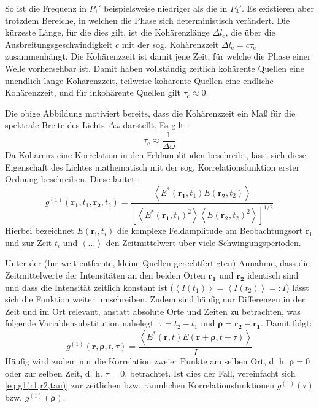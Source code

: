 So ist die Frequenz in $P_1'$ beispielsweise niedriger als die in $P_3'$. 
Es existieren aber trotzdem Bereiche, in welchen die Phase sich deterministisch verändert. 
Die kürzeste Länge, für die dies gilt, ist die Kohärenzlänge $\Delta l_\mathrm{c}$, die über die Ausbreitungsgeschwindigkeit $c$ mit der sog. Kohärenzzeit $\Delta l_\mathrm{c} = c\tau_{\mathrm{c}}$ zusammenhängt. 
Die Kohärenzzeit ist damit jene Zeit, für welche die Phase einer Welle vorhersehbar ist. 
Damit haben vollständig zeitlich kohärente Quellen eine unendlich lange Kohärenzzeit, teilweise kohärente Quellen eine endliche Kohärenzzeit, und für inkohärente Quellen gilt $\tau_{\mathrm{c}}\approx 0$. 

Die obige Abbildung motiviert bereits, dass die Kohärenzzeit ein Maß für die spektrale Breite des Lichts $\Delta \omega$ darstellt. 
Es gilt \cite{foxQuantumOpticsIntroduction2006}:
\begin{equation}
    \tau_{\mathrm{c}}  \approx \frac{1}{\Delta \omega}
    \label{eq:tau(delta nu)}
\end{equation}
Da Kohärenz eine Korrelation in den Feldamplituden beschreibt, lässt sich diese Eigenschaft des Lichtes mathematisch mit der sog. Korrelationsfunktion erster Ordnung beschreiben. 
Diese lautet \cite{foellmiIntensityInterferometrySecondorder2009}:
\begin{equation}
    g^{(1)}(\mathbf{r_1}, t_1, \mathbf{r_2}, t_2) = \frac{\left<E^*(\mathbf{r_1}, t_1)E(\mathbf{r_2}, t_2)\right>}{\left[\left<E^*(\mathbf{r_1}, t_1)^2\right> \left<E(\mathbf{r_2}, t_2)^2\right>\right]^{1/2}}
    \label{eq:g1(r1,t1,r2,t2)}
\end{equation}
Hierbei bezeichnet $E(\mathbf{r_i},t_i)$ die komplexe Feldamplitude am Beobachtungsort $\mathbf{r_i}$ und zur Zeit $t_i$ und $\left<\dots\right>$ den Zeitmittelwert über viele Schwingungsperioden. 

Unter der (für weit entfernte, kleine Quellen gerechtfertigten) Annahme, dass die Zeitmittelwerte der Intensitäten an den beiden Orten $\mathbf{r_1}$ und $\mathbf{r_2}$ identisch sind und dass die Intensität zeitlich konstant ist ($\left<I(t_1)\right>=\left<I(t_2)\right>=:I$) lässt sich die Funktion weiter umschreiben. 
Zudem sind häufig nur Differenzen in der Zeit und im Ort relevant, anstatt absolute Orte und Zeiten zu betrachten, was folgende Variablensubstitution nahelegt: $\tau = t_2 -t_1$ und $\bm{\rho} = \mathbf{r_2} - \mathbf{r_1}$. 
Damit folgt:
\begin{equation}
    g^{(1)}(\mathbf{r}, \bm{\rho}, t, \tau) = \frac{\left<E^*(\mathbf{r}, t)E(\mathbf{r}+\bm{\rho}, t+\tau)\right>}{I}
    \label{eq:g1(r1,r2,tau)}
\end{equation}
Häufig wird zudem nur die Korrelation zweier Punkte am selben Ort, d. h. $\bm{\rho}=0$ oder zur selben Zeit, d. h. $\tau=0$, betrachtet. 
Ist dies der Fall, vereinfacht sich \autoref{eq:g1(r1,r2,tau)} zur zeitlichen bzw. räumlichen Korrelationsfunktionen $g^{(1)}(\tau)$ bzw. $g^{(1)}(\bm{\rho})$.


